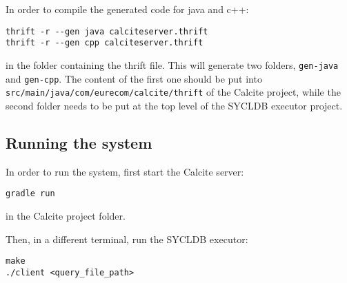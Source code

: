 \documentclass[a4paper, 10pt]{article}
\begin{document}
In order to compile the generated code for java and c++:
\begin{verbatim}
thrift -r --gen java calciteserver.thrift
thrift -r --gen cpp calciteserver.thrift
\end{verbatim}
in the folder containing the thrift file. This will generate two folders, \texttt{gen-java} and \texttt{gen-cpp}. The content of the first one should be put into \texttt{src/main/java/com/eurecom/calcite/thrift} of the Calcite project, while the second folder needs to be put at the top level of the SYCLDB executor project.

\subsection{Running the system}
In order to run the system, first start the Calcite server:
\begin{verbatim}
gradle run
\end{verbatim}
in the Calcite project folder.

Then, in a different terminal, run the SYCLDB executor:
\begin{verbatim}
make
./client <query_file_path>
\end{verbatim}
\end{document}
